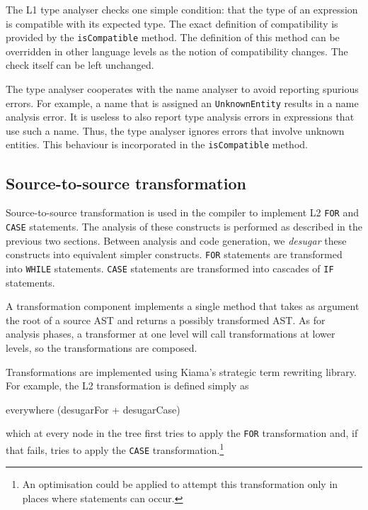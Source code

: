 The L1 type analyser checks one simple condition: that the type of an expression is compatible with its expected type.
The exact definition of compatibility is provided by the \verb|isCompatible| method.
The definition of this method can be overridden in other language levels as the notion of compatibility changes.
The check itself can be left unchanged.

The type analyser cooperates with the name analyser to avoid reporting spurious errors.
For example, a name that is assigned an \verb|UnknownEntity| results in a name analysis error.
It is useless to also report type analysis errors in expressions that use such a name.
Thus, the type analyser ignores errors that involve unknown entities.
This behaviour is incorporated in the \verb|isCompatible| method.

\subsection{Source-to-source transformation}

Source-to-source transformation is used in the compiler to implement L2 \verb|FOR| and \verb|CASE| statements.
The analysis of these constructs is performed as described in the previous two sections.
Between analysis and code generation, we \emph{desugar} these constructs into equivalent simpler constructs.
\verb|FOR| statements are transformed into \verb|WHILE| statements.
\verb|CASE| statements are transformed into cascades of \verb|IF| statements.

A transformation component implements a single method that takes as argument the root of a source AST and returns a possibly transformed AST.
As for analysis phases, a transformer at one level will call transformations at lower levels, so the transformations are composed.

Transformations are implemented using Kiama's strategic term rewriting library.
For example, the L2 transformation is defined simply as

\begin{scala}
  everywhere (desugarFor + desugarCase)
\end{scala}

\noindent
which at every node in the tree first tries to apply the \verb|FOR| transformation and, if that fails, tries to apply the \verb|CASE| transformation.\footnote{An optimisation could be applied to attempt this transformation only in places where statements can occur.}

